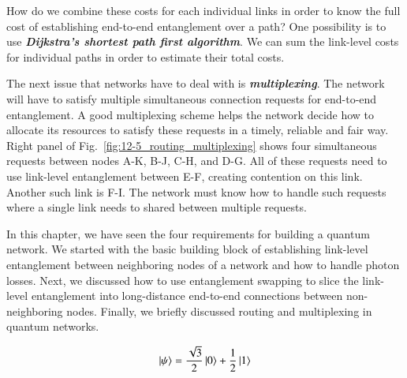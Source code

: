 How do we combine these costs for each individual links in order to know the full cost of establishing end-to-end entanglement over a path?
One possibility is to use \textit{\textbf{Dijkstra's shortest path first algorithm}}.
We can sum the link-level costs for individual paths in order to estimate their total costs. 

The next issue that networks have to deal with is \textit{\textbf{multiplexing}}.
The network will have to satisfy multiple simultaneous connection requests for end-to-end entanglement.
A good multiplexing scheme helps the network decide how to allocate its resources to satisfy these requests in a timely, reliable and fair way.
Right panel of Fig.~\ref{fig:12-5_routing_multiplexing} shows four simultaneous requests between nodes A-K, B-J, C-H, and D-G.
All of these requests need to use link-level entanglement between E-F, creating contention on this link.
Another such link is F-I.
The network must know how to handle such requests where a single link needs to shared between multiple requests.

In this chapter, we have seen the four requirements for building a quantum network.
We started with the basic building block of establishing link-level entanglement between neighboring nodes of a network and how to handle photon losses.
Next, we discussed how to use entanglement swapping to slice the link-level entanglement into long-distance end-to-end connections between non-neighboring nodes.
Finally, we briefly discussed routing and multiplexing in quantum networks.

\newpage
\begin{exercises}
\begin{equation*}
\left| \psi \right\rangle = \frac{\sqrt{3}}{2}\left| 0 \right\rangle + \frac{1}{2}\left| 1 \right\rangle
\end{equation*}


\end{exercises}

